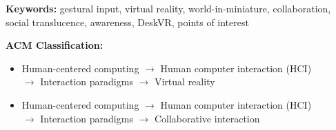 \vspace{1em}

\noindent\textbf{Keywords:} gestural input, virtual reality, world-in-miniature, collaboration, social translucence, awareness, DeskVR, points of interest

\vspace{1em}

\noindent\textbf{ACM Classification:}

\begin{itemize}
    \item Human-centered computing $\rightarrow$ Human computer interaction (HCI) \\ $\rightarrow$ Interaction paradigms $\rightarrow$ Virtual reality 
    \item Human-centered computing $\rightarrow$ Human computer interaction (HCI) \\ $\rightarrow$ Interaction paradigms $\rightarrow$ Collaborative interaction
\end{itemize}
